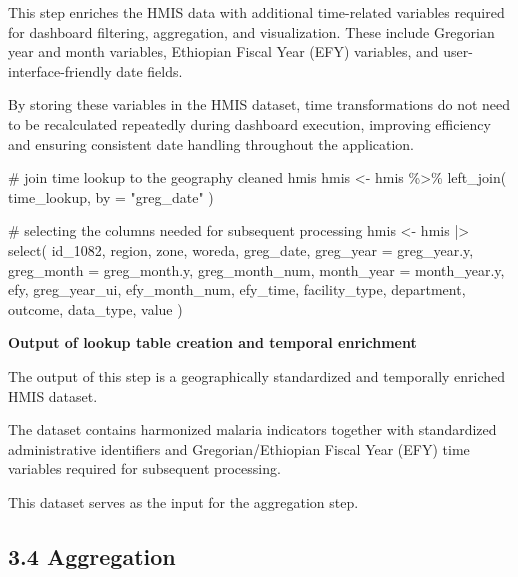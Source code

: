 \documentclass[
  letterpaper,
  DIV=11,
  numbers=noendperiod]{scrartcl}
\newenvironment{Shaded}{\begin{snugshade}}{\end{snugshade}}
\newcommand{\AttributeTok}[1]{\textcolor[rgb]{0.40,0.45,0.13}{#1}}
\newcommand{\CommentTok}[1]{\textcolor[rgb]{0.37,0.37,0.37}{#1}}
\newcommand{\FunctionTok}[1]{\textcolor[rgb]{0.28,0.35,0.67}{#1}}
\newcommand{\NormalTok}[1]{\textcolor[rgb]{0.00,0.23,0.31}{#1}}
\newcommand{\OtherTok}[1]{\textcolor[rgb]{0.00,0.23,0.31}{#1}}
\newcommand{\SpecialCharTok}[1]{\textcolor[rgb]{0.37,0.37,0.37}{#1}}
\newcommand{\StringTok}[1]{\textcolor[rgb]{0.13,0.47,0.30}{#1}}
\begin{document}
This step enriches the HMIS data with additional time-related variables
required for dashboard filtering, aggregation, and visualization. These
include Gregorian year and month variables, Ethiopian Fiscal Year (EFY)
variables, and user-interface-friendly date fields.

By storing these variables in the HMIS dataset, time transformations do
not need to be recalculated repeatedly during dashboard execution,
improving efficiency and ensuring consistent date handling throughout
the application.

\begin{Shaded}
\begin{Highlighting}[]
\CommentTok{\# join time lookup to the geography cleaned hmis}
\NormalTok{hmis }\OtherTok{\textless{}{-}}\NormalTok{ hmis }\SpecialCharTok{\%\textgreater{}\%}
  \FunctionTok{left\_join}\NormalTok{(}
\NormalTok{    time\_lookup,}
    \AttributeTok{by =} \StringTok{"greg\_date"}
\NormalTok{  )}

\CommentTok{\# selecting the columns needed for subsequent processing}
\NormalTok{hmis }\OtherTok{\textless{}{-}}\NormalTok{ hmis }\SpecialCharTok{|\textgreater{}}
  \FunctionTok{select}\NormalTok{(}
\NormalTok{    id\_1082,}
\NormalTok{    region,}
\NormalTok{    zone,}
\NormalTok{    woreda,}
\NormalTok{    greg\_date,}
    \AttributeTok{greg\_year =}\NormalTok{ greg\_year.y,}
    \AttributeTok{greg\_month =}\NormalTok{ greg\_month.y,}
\NormalTok{    greg\_month\_num,}
    \AttributeTok{month\_year =}\NormalTok{ month\_year.y,}
\NormalTok{    efy,}
\NormalTok{    greg\_year\_ui,}
\NormalTok{    efy\_month\_num,}
\NormalTok{    efy\_time,}
\NormalTok{    facility\_type,}
\NormalTok{    department,}
\NormalTok{    outcome,}
\NormalTok{    data\_type,}
\NormalTok{    value}
\NormalTok{  )}
\end{Highlighting}
\end{Shaded}

\textbf{Output of lookup table creation and temporal enrichment}

The output of this step is a geographically standardized and temporally
enriched HMIS dataset.

The dataset contains harmonized malaria indicators together with
standardized administrative identifiers and Gregorian/Ethiopian Fiscal
Year (EFY) time variables required for subsequent processing.

This dataset serves as the input for the aggregation step.

\subsection{3.4 Aggregation}\label{aggregation}
\end{document}
